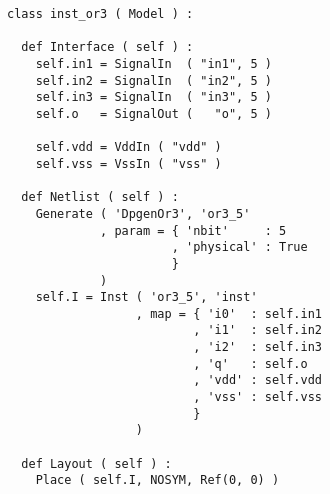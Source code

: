 \begin{itemize}
\begin{verbatim}
class inst_or3 ( Model ) :

  def Interface ( self ) :
    self.in1 = SignalIn  ( "in1", 5 )
    self.in2 = SignalIn  ( "in2", 5 )
    self.in3 = SignalIn  ( "in3", 5 )
    self.o   = SignalOut (   "o", 5 )

    self.vdd = VddIn ( "vdd" )
    self.vss = VssIn ( "vss" )
    
  def Netlist ( self ) :
    Generate ( 'DpgenOr3', 'or3_5'
             , param = { 'nbit'     : 5 
                       , 'physical' : True
                       }
             )
    self.I = Inst ( 'or3_5', 'inst'
                  , map = { 'i0'  : self.in1
                          , 'i1'  : self.in2
                          , 'i2'  : self.in3
                          , 'q'   : self.o
                          , 'vdd' : self.vdd
                          , 'vss' : self.vss
                          }
                  )
    
  def Layout ( self ) :
    Place ( self.I, NOSYM, Ref(0, 0) )
\end{verbatim}
\end{itemize}
